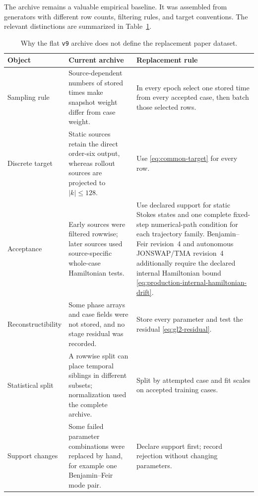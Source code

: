 \documentclass[11pt]{article}
\begin{document}
The archive remains a valuable empirical baseline.  It was assembled from
generators with different row counts, filtering rules, and target
conventions.  The relevant distinctions are summarized in
Table~\ref{tab:v9-defects}.

\begin{table}[ht]
  \centering
  \caption{Why the flat \texttt{v9} archive does not define the replacement
  paper dataset.}
  \label{tab:v9-defects}
  \small
  \begin{tabularx}{\textwidth}{
    @{}>{\raggedright\arraybackslash}p{}
       >{\raggedright\arraybackslash}X
       >{\raggedright\arraybackslash}p{}@{}}
    \toprule
    Object & Current archive & Replacement rule \\
    \midrule
    Sampling rule
      & Source-dependent numbers of stored times make snapshot weight differ
        from case weight.
      & In every epoch select one stored time from every accepted case, then
        batch those selected rows. \\
    Discrete target
      & Static sources retain the direct order-six output, whereas rollout
        sources are projected to $|k|\leq128$.
      & Use \eqref{eq:common-target} for every row. \\
    Acceptance
      & Early sources were filtered rowwise; later sources used
        source-specific whole-case Hamiltonian tests.
      & Use declared support for static Stokes states and one complete
        fixed-step numerical-path condition for each trajectory family.
        Benjamin--Feir revision~4 and autonomous JONSWAP/TMA revision~4 additionally
        require the declared internal Hamiltonian bound
        \eqref{eq:production-internal-hamiltonian-drift}. \\
    Reconstructibility
      & Some phase arrays and case fields were not stored, and no stage
        residual was recorded.
      & Store every parameter and test the residual
        \eqref{eq:gl2-residual}. \\
    Statistical split
      & A rowwise split can place temporal siblings in different subsets;
        normalization used the complete archive.
      & Split by attempted case and fit scales on accepted training cases. \\
    Support changes
      & Some failed parameter combinations were replaced by hand, for example
        one Benjamin--Feir mode pair.
      & Declare support first; record rejection without changing parameters. \\
    \bottomrule
  \end{tabularx}
\end{table}
\end{document}
